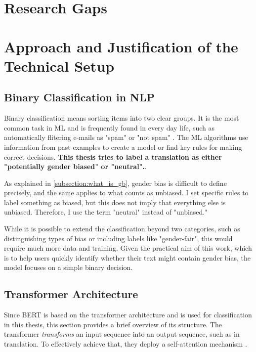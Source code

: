 
\section{Research Gaps}


\section{Approach and Justification of the Technical Setup}



\subsection{Binary Classification in NLP}
Binary classification means sorting items into two clear groups. It is the most common task in ML and is frequently found in every day life, such as automatically flitering e-mails as "spam" or "not spam" \citep{quemyBinaryClassificationUnstructured2019}. The ML algorithms use information from past examples to create a model or find key rules for making correct decisions. \textbf{This thesis tries to label a translation as either "potentially gender biased" or "neutral".}. 

As explained in \autoref{subsection:what_is_gb}, gender bias is difficult to define precisely, and the same applies to what counts as unbiased. I set specific rules to label something as biased, but this does not imply that everything else is unbiased. Therefore, I use the term "neutral" instead of "unbiased."

While it is possible to extend the classification beyond two categories, such as distinguishing types of bias or including labels like "gender-fair", this would require much more data and training. Given the practical aim of this work, which is to help users quickly identify whether their text might contain gender bias, the model focuses on a simple binary decision.


\subsection{Transformer Architecture} \label{subsection:transformer_arch}
Since BERT is based on the transformer architecture and is used for classification in this thesis, this section provides a brief overview of its structure. The transformer \textit{transforms} an input sequence into an output sequence, such as in translation. To effectively achieve that, they deploy a self-attention mechanism \citep{phuongFormalAlgorithmsTransformers2022}.

